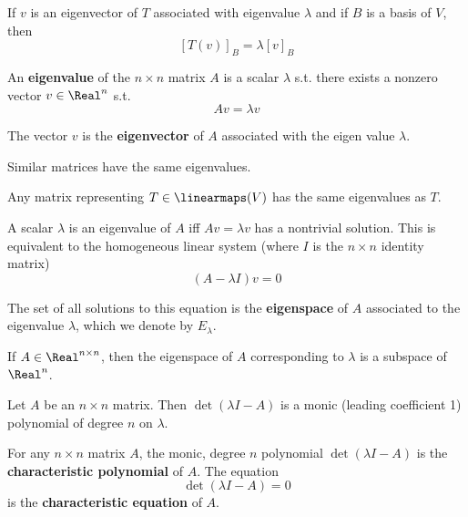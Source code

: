 \begin{lemma}
  If $v$ is an eigenvector of $T$ associated with eigenvalue $\lambda$ and if $B$ is a basis of $V$, then
  \[
    [T(v)]_B = \lambda [v]_B
  \]
\end{lemma}

\begin{definition}
  An \textbf{eigenvalue} of the $n \times n$ matrix $A$ is a scalar $\lambda$ s.t. there exists a nonzero vector $v \in \Real^n$ s.t.
  \[
    Av = \lambda v
  \]

  The vector $v$ is the \textbf{eigenvector} of $A$ associated with the eigen value $\lambda$.
\end{definition}

\begin{lemma}
  Similar matrices have the same eigenvalues.

  Any matrix representing $T \in \linearmaps(V)$ has the same eigenvalues as $T$.
\end{lemma}

\begin{definition}[Eigenspace]
  A scalar $\lambda$ is an eigenvalue of $A$ iff $Av = \lambda v$ has a nontrivial solution. This is equivalent to the homogeneous linear system (where $I$ is the $n \times n$ identity matrix)
  \[
    (A - \lambda I) v = 0
  \]

  The set of all solutions to this equation is the \textbf{eigenspace} of $A$ associated to the eigenvalue $\lambda$, which we denote by $E_\lambda$.
\end{definition}

\begin{lemma}
  If $A \in \Real^{n \times n}$, then the eigenspace of $A$ corresponding to $\lambda$ is a subspace of $\Real^n$.
\end{lemma}

\begin{lemma}
  Let $A$ be an $n \times n$ matrix. Then $\det(\lambda I - A)$ is a monic (leading coefficient 1) polynomial of degree $n$ on $\lambda$.
\end{lemma}

\begin{definition}
  For any $n \times n$ matrix $A$, the monic, degree $n$ polynomial $\det(\lambda I - A)$ is the \textbf{characteristic polynomial} of $A$. The equation
  \[
    \det(\lambda I - A) = 0
  \]
  is the \textbf{characteristic equation} of $A$.
\end{definition}

